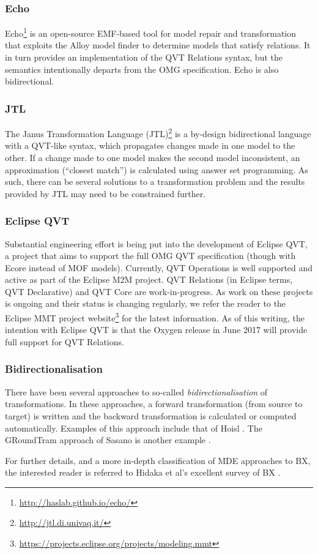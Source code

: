 \subsubsection{Echo}
Echo\footnote{\url{http://haslab.github.io/echo/}} is an open-source EMF-based tool for model repair and transformation that exploits the Alloy model finder to determine models that satisfy relations. It in turn provides an implementation of the QVT Relations syntax, but the semantics intentionally departs from the OMG specification. Echo is also bidirectional.

\subsubsection{JTL}
The Janus Transformation Language (JTL)\footnote{\url{http://jtl.di.univaq.it/}} is a by-design bidirectional language with a QVT-like syntax, which propagates changes made in one model to the other. If a change made to one model makes the second model inconsistent, an approximation (``closest match'') is calculated using answer set programming. As such, there can be several solutions to a transformation problem and the results provided by JTL may need to be constrained further.

\subsubsection{Eclipse QVT}
Substantial engineering effort is being put into the development of Eclipse QVT, a project that
aims to support the full OMG QVT specification (though with Ecore instead of MOF models). Currently, QVT Operations is well supported and active as part of the Eclipse M2M project. QVT Relations (in Eclipse terms, QVT Declarative) and QVT Core are work-in-progress. As work on these projects is ongoing and their status is changing regularly, we refer the reader to the Eclipse MMT project website\footnote{\url{https://projects.eclipse.org/projects/modeling.mmt}} for the latest information. As of this writing, the intention with Eclipse QVT is that the Oxygen release in June 2017 will provide full support for QVT Relations.

\subsubsection{Bidirectionalisation}
There have been several approaches to so-called \textit{bidirectionalisation} of transformations. In these approaches, a forward transformation (from source to target) is written and the backward transformation is calculated or computed automatically. Examples of this approach include that of Hoisl \cite{HoislHH14a}. The GRoundTram approach of Sasano is another example \cite{SasanoHHIKN11}.

\vspace{4mm}

For further details, and a more in-depth classification of MDE approaches to BX, the interested reader is referred to Hidaka et al's excellent survey of BX \cite{HidakaTCH16}.


